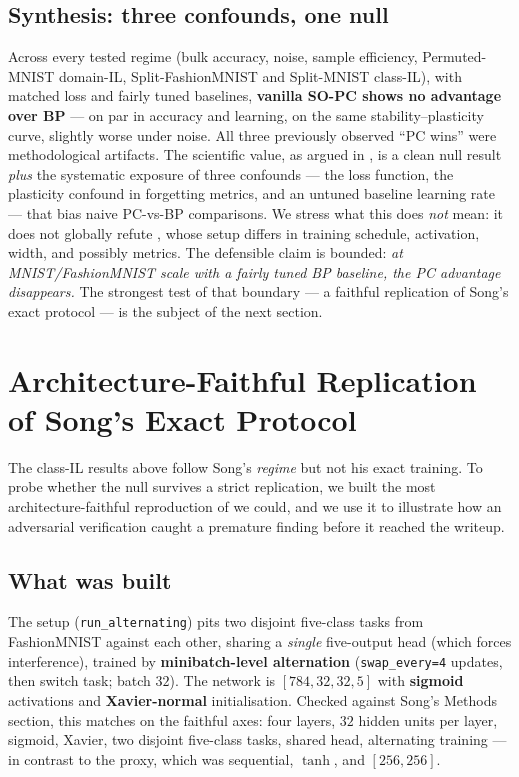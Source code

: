 \subsection{Synthesis: three confounds, one null}

Across every tested regime (bulk accuracy, noise, sample efficiency, Permuted-MNIST domain-IL,
Split-FashionMNIST and Split-MNIST class-IL), with matched loss and fairly tuned baselines,
\textbf{vanilla SO-PC shows no advantage over BP} --- on par in accuracy and learning, on the same
stability--plasticity curve, slightly worse under noise. All three previously observed ``PC wins''
were methodological artifacts. The scientific value, as argued in , is a clean
null result \emph{plus} the systematic exposure of three confounds --- the loss function, the
plasticity confound in forgetting metrics, and an untuned baseline learning rate --- that bias
naive PC-vs-BP comparisons. We stress what this does \emph{not} mean: it does not globally refute
\citet{song2024prospective}, whose setup differs in training schedule, activation, width, and
possibly metrics. The defensible claim is bounded: \emph{at MNIST/FashionMNIST scale with a fairly
tuned BP baseline, the PC advantage disappears.} The strongest test of that boundary --- a faithful
replication of Song's exact protocol --- is the subject of the next section.

\section{Architecture-Faithful Replication of Song's Exact Protocol}\label{sec:exp-song}

The class-IL results above follow Song's \emph{regime} but not his exact training. To probe whether
the null survives a strict replication, we built the most architecture-faithful reproduction of
\citet{song2024prospective} we could, and we use it to illustrate how an adversarial verification
caught a premature finding before it reached the writeup.

\subsection{What was built}

The setup (\texttt{run\_alternating}) pits two disjoint five-class tasks from FashionMNIST against
each other, sharing a \emph{single} five-output head (which forces interference), trained by
\textbf{minibatch-level alternation} (\texttt{swap\_every=4} updates, then switch task; batch
\(32\)). The network is \([784,32,32,5]\) with \textbf{sigmoid} activations and
\textbf{Xavier-normal} initialisation. Checked against Song's Methods section, this matches on the
faithful axes: four layers, \(32\) hidden units per layer, sigmoid, Xavier, two disjoint
five-class tasks, shared head, alternating training --- in contrast to the 
proxy, which was sequential, \(\tanh\), and \([256,256]\).

